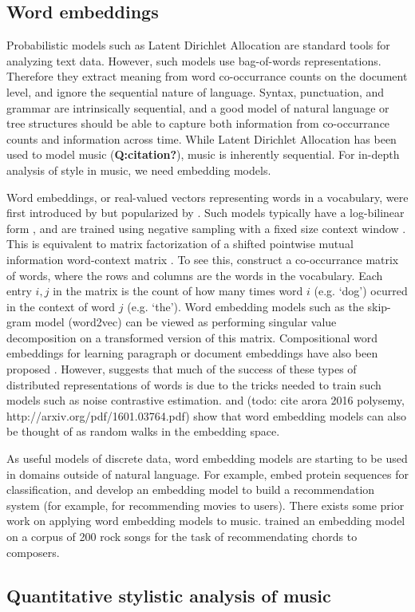 
\subsection{Word embeddings}
Probabilistic models such as Latent Dirichlet Allocation \cite{Blei2003} are standard tools for analyzing text data. However, such models use bag-of-words representations. Therefore they extract meaning from word co-occurrance counts on the document level, and ignore the sequential nature of language. Syntax, punctuation, and grammar are intrinsically sequential, and a good model of natural language or tree structures should be able to capture both information from co-occurrance counts and information across time. While Latent Dirichlet Allocation has been used to model music (\textbf{Q:citation?}), music is inherently sequential. For in-depth analysis of style in music, we need embedding models.

Word embeddings, or real-valued vectors representing words in a vocabulary, were first introduced by \cite{Bengio2003} but popularized by \cite{Mikolov2013a}. Such models typically have a log-bilinear form \cite{Mnih2007}, and are trained using negative sampling with a fixed size context window \cite{Mikolov2013a}. This is equivalent to matrix factorization of a shifted pointwise mutual information word-context matrix \cite{Levy}. To see this, construct a co-occurrance matrix of words, where the rows and columns are the words in the vocabulary. Each entry $i, j$ in the matrix is the count of how many times word $i$ (e.g. `dog') ocurred in the context of word $j$ (e.g. `the'). Word embedding models such as the skip-gram model (word2vec) can be viewed as performing singular value decomposition on a transformed version of this matrix.  Compositional word embeddings for learning paragraph or document embeddings have also been proposed \cite{Le2014,Dai2015}. However, \cite{Levy2015a} suggests that much of the success of these types of distributed representations of words is due to the tricks needed to train such models such as noise contrastive estimation. \cite{Arora2015} and (todo: cite arora 2016 polysemy, http://arxiv.org/pdf/1601.03764.pdf) show that word embedding models can also be thought of as random walks in the embedding space.

As useful models of discrete data, word embedding models are starting to be used in domains outside of natural language. For example, \cite{Asgari2015} embed protein sequences for classification, and \cite{Guardia-Sebaoun2015} develop an embedding model to build a recommendation system (for example, for recommending movies to users).
There exists some prior work on applying word embedding models to music. \cite{Name2015} trained an embedding model on a corpus of 200 rock songs for the task of recommendating chords to composers.

\subsection{Quantitative stylistic analysis of music}
